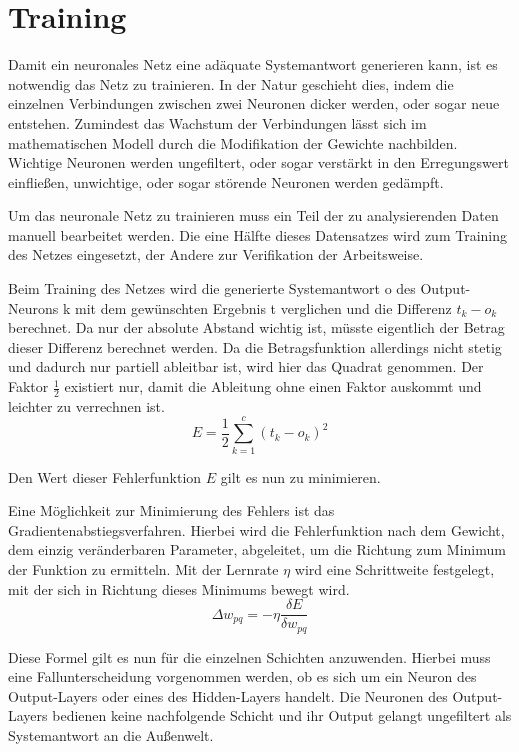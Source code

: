 \section{Training}

Damit ein neuronales Netz eine adäquate Systemantwort generieren kann, ist es not\-wen\-dig das Netz zu trainieren. In der Natur geschieht dies, indem die einzelnen Verbindungen zwischen zwei Neuronen dicker werden, oder sogar neue entstehen. Zumindest das Wachstum der Verbindungen lässt sich im mathematischen Modell durch die Modifikation der Gewichte nachbilden. Wichtige Neuronen werden ungefiltert, oder sogar verstärkt in den Erregungswert einfließen, unwichtige, oder sogar störende Neuronen werden gedämpft.

Um das neuronale Netz zu trainieren muss ein Teil der zu analysierenden Daten manuell bearbeitet werden. Die eine Hälfte dieses Datensatzes wird zum Training des Netzes eingesetzt, der Andere zur Verifikation der Arbeitsweise.
 
Beim Training des Netzes wird die generierte Systemantwort o des Output-Neurons k mit dem gewünschten Ergebnis t verglichen und die Differenz $t_k - o_k$ berechnet. Da nur der absolute Abstand wichtig ist, müsste eigentlich der Betrag dieser Differenz berechnet werden. Da die Betragsfunktion allerdings nicht stetig und dadurch nur partiell ableitbar ist, wird hier das Quadrat genommen. Der Faktor $\frac{1}{2}$ existiert nur, damit die Ableitung ohne einen Faktor auskommt und leichter zu verrechnen ist.
\begin{equation}
E = \frac{1}{2} \sum_{k=1}^{c}(t_{k}-o_{k})^2
\end{equation}

Den Wert dieser Fehlerfunktion $E$ gilt es nun zu minimieren.

Eine Möglichkeit zur Minimierung des Fehlers ist das Gradientenabstiegsverfahren. Hierbei wird die Fehlerfunktion nach dem Gewicht, dem einzig veränderbaren Parameter, abgeleitet, um die Richtung zum Minimum der Funktion zu ermitteln. Mit der Lernrate $\eta$ wird eine Schrittweite festgelegt, mit der sich in Richtung dieses Minimums bewegt wird.
\begin{equation}
\Delta w_{pq}=-\eta \frac{\delta E}{\delta w_{pq}}
\end{equation}

Diese Formel gilt es nun für die einzelnen Schichten anzuwenden. Hierbei muss eine Fall\-unter\-scheidung vorgenommen werden, ob es sich um ein Neuron des Output-Layers oder eines des Hidden-Layers handelt. Die Neuronen des Output-Layers bedienen keine nachfolgende Schicht und ihr Output gelangt ungefiltert als Systemantwort an die Außenwelt.

